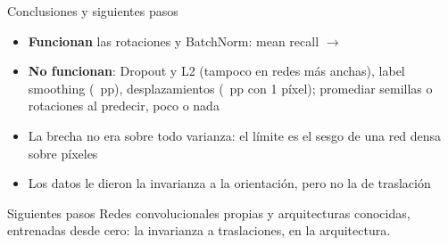 \begin{frame}{Conclusiones y siguientes pasos}
  \begin{itemize}
    \item \textbf{Funcionan} las rotaciones y BatchNorm: mean recall  $\rightarrow$ 
    \item \textbf{No funcionan}: Dropout y L2 (tampoco en redes más anchas), label smoothing (~pp), desplazamientos (~pp con 1 píxel); promediar semillas o rotaciones al predecir, poco o nada
    \item La brecha no era sobre todo varianza: el límite es el sesgo de una red densa sobre píxeles
    \item Los datos le dieron la invarianza a la orientación, pero no la de traslación
  \end{itemize}
  \vspace{0.2cm}
  \begin{alertblock}{Siguientes pasos}
    Redes convolucionales propias y arquitecturas conocidas, entrenadas desde cero: la invarianza a traslaciones, en la arquitectura.
  \end{alertblock}
\end{frame}
